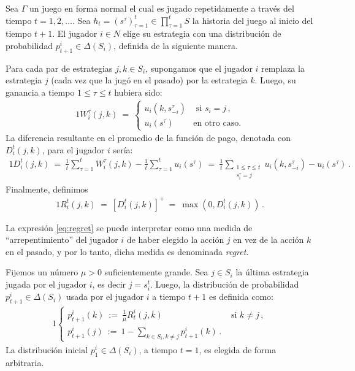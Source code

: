 Sea $\Gamma$ un juego en forma normal el cual es jugado repetidamente a través del tiempo $t = 1, 2, \ldots $. 
Sea $h_t = (s^\tau)_{\tau = 1}^t \in \prod_{\tau = 1}^{t} S$ la historia del juego al inicio del tiempo $t+1$. El jugador $i \in N$ elige su estrategia con una distribución de probabilidad $p_{t+1}^i \in \Delta(S_i)$, definida de la siguiente manera.

Para cada par de estrategias $j, k \in S_i$, supongamos que el jugador $i$ remplaza la estrategia $j$ (cada vez que la jugó en el pasado) por la estrategia $k$. Luego, su ganancia a tiempo $1\leq \tau \leq t$ hubiera sido:
\begin{alignat}{1}
W_i^{\tau}(j,k)\ =\ 
\begin{cases}
u_i(k, s_{-i}^{\tau}) &\text{ si } s_i = j \,, \\
u_i(s^\tau) & \text{en otro caso.} 
\end{cases}
\end{alignat}
La diferencia resultante en el promedio de la función de pago, denotada con $D_i^t(j, k)$, para el jugador $i$ sería:
\begin{alignat}{1}
  D_i^t(j, k)\ 
    =\ \frac{1}{t} \sum_{\tau = 1}^{t} W_i^{\tau}(j, k) - \frac{1}{t} \sum_{\tau = 1}^{t} u_i(s^{\tau})\ 
	=\ \frac{1}{t} \sum_{\substack{1\leq \tau \leq t \\s^\tau_i = j}} u_i(k, s_{-i}^{\tau}) - u_i(s^{\tau}) \,.
\end{alignat}
Finalmente, definimos
\begin{alignat}{1}
\label{eq:regret}
R_i^t(j, k)\ =\ [D_i^t(j, k)]^+\ =\ \max(0, D_i^t(j, k)) \,.
\end{alignat}

La expresión \eqref{eq:regret} se puede interpretar como una medida de ``arrepentimiento'' del jugador $i$ de haber elegido la acción $j$ en vez de la acción $k$ en el pasado, y por lo tanto, dicha medida es denominada \textit{regret}.

Fijemos un número $\mu > 0$ suficientemente grande. Sea $j \in S_i$ la última estrategia jugada por el jugador $i$, es decir $j = s_i^t$. Luego, la distribución de probabilidad $p_{t+1}^i \in \Delta(S_i)$ usada por el jugador $i$ a tiempo $t+1$ es definida como:
\begin{alignat}{1}
\label{eq:proc-A}
  \begin{cases}
    p_{t+1}^i(k)\ :=\  \frac{1}{\mu} R_t^i(j, k) & \text{ si } k \neq j \,, \\
    p_{t+1}^i(j)\ :=\ 1 - \sum_{k \in S_i, k \neq j} p_{t+1}^i(k) \,.
  \end{cases}
\end{alignat}
La distribución inicial $p_{1}^i \in \Delta(S_i)$, a tiempo $t=1$, es elegida de forma arbitraria.


